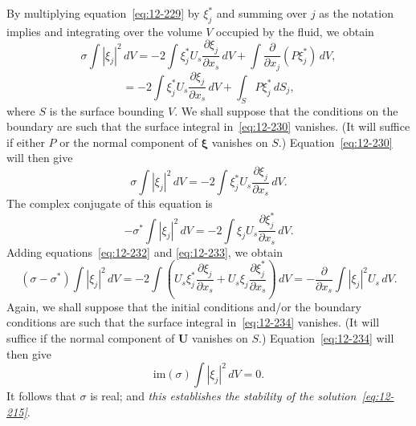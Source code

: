 By multiplying equation~\eqref{eq:12-229} by $\xi_j^*$ and summing over $j$ as the notation implies and integrating over the volume $V$ occupied by the fluid, we obtain
\begin{equation}
\label{eq:12-230}
\sigma \int |\xi_j|^2 \, dV = -2 \int \xi_j^* U_s \frac{\partial \xi_j}{\partial x_s} \, dV + \int \frac{\partial}{\partial x_j}(P\xi_j^*) \, dV,
\end{equation}
\begin{equation}
\label{eq:12-231}
= -2 \int \xi_j^* U_s\frac{\partial \xi_j}{\partial x_s}\,dV + \int_S P\xi_j^* \, dS_j,
\end{equation}
where $S$ is the surface bounding $V$. We shall suppose that the conditions on the boundary are such that the surface integral in~\eqref{eq:12-230} vanishes. (It will suffice if either $P$ or the normal component of $\boldsymbol\xi$ vanishes on $S$.) Equation~\eqref{eq:12-230} will then give
\begin{equation}
\label{eq:12-232}
\sigma \int |\xi_j|^2 \, dV = -2 \int \xi_j^* U_s\frac{\partial \xi_j}{\partial x_s}\,dV.
\end{equation}
The complex conjugate of this equation is
\begin{equation}
\label{eq:12-233}
-\sigma^* \int |\xi_j|^2 \, dV = -2 \int \xi_j U_s \frac{\partial \xi_j^*}{\partial x_s}\,dV.
\end{equation}
Adding equations~\eqref{eq:12-232} and \eqref{eq:12-233}, we obtain
\begin{equation}
\label{eq:12-234}
(\sigma - \sigma^*) \int |\xi_j|^2 \, dV = -2\int (U_s\xi_j^*\frac{\partial \xi_j}{\partial x_s} + U_s\xi_j\frac{\partial \xi_j^*}{\partial x_s})\,dV = -\frac{\partial}{\partial x_s}\int |\xi_j|^2 U_s\, dV.
\end{equation}
Again, we shall suppose that the initial conditions and/or the boundary conditions are such that the surface integral in~\eqref{eq:12-234} vanishes. (It will suffice if the normal component of $\mathbf{U}$ vanishes on $S$.) Equation~\eqref{eq:12-234} will then give
\begin{equation}
\label{eq:12-235}
\mathrm{im}(\sigma) \int |\xi_j|^2 \, dV = 0.
\end{equation}
It follows that $\sigma$ is real; and \emph{this establishes the stability of the solution~\eqref{eq:12-215}}.

